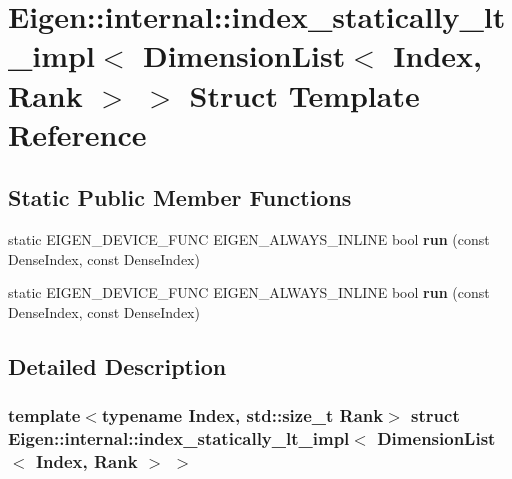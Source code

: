 \hypertarget{struct_eigen_1_1internal_1_1index__statically__lt__impl_3_01_dimension_list_3_01_index_00_01_rank_01_4_01_4}{}\section{Eigen\+:\+:internal\+:\+:index\+\_\+statically\+\_\+lt\+\_\+impl$<$ Dimension\+List$<$ Index, Rank $>$ $>$ Struct Template Reference}
\label{struct_eigen_1_1internal_1_1index__statically__lt__impl_3_01_dimension_list_3_01_index_00_01_rank_01_4_01_4}
\subsection*{Static Public Member Functions}
\begin{DoxyCompactItemize}
\item 
\mbox{\label{struct_eigen_1_1internal_1_1index__statically__lt__impl_3_01_dimension_list_3_01_index_00_01_rank_01_4_01_4_aed37051f344e4c256645b03b1b435ff5}} 
static E\+I\+G\+E\+N\+\_\+\+D\+E\+V\+I\+C\+E\+\_\+\+F\+U\+NC E\+I\+G\+E\+N\+\_\+\+A\+L\+W\+A\+Y\+S\+\_\+\+I\+N\+L\+I\+NE bool {\bfseries run} (const Dense\+Index, const Dense\+Index)
\item 
\mbox{\label{struct_eigen_1_1internal_1_1index__statically__lt__impl_3_01_dimension_list_3_01_index_00_01_rank_01_4_01_4_aed37051f344e4c256645b03b1b435ff5}} 
static E\+I\+G\+E\+N\+\_\+\+D\+E\+V\+I\+C\+E\+\_\+\+F\+U\+NC E\+I\+G\+E\+N\+\_\+\+A\+L\+W\+A\+Y\+S\+\_\+\+I\+N\+L\+I\+NE bool {\bfseries run} (const Dense\+Index, const Dense\+Index)
\end{DoxyCompactItemize}


\subsection{Detailed Description}
\subsubsection*{template$<$typename Index, std\+::size\+\_\+t Rank$>$\newline
struct Eigen\+::internal\+::index\+\_\+statically\+\_\+lt\+\_\+impl$<$ Dimension\+List$<$ Index, Rank $>$ $>$}



